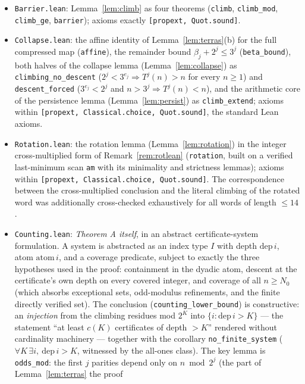 \documentclass[11pt]{article}
\theoremstyle{definition}
\begin{document}
\begin{itemize}
\item \texttt{Barrier.lean}: Lemma~\ref{lem:climb} as four theorems
  (\texttt{climb}, \texttt{climb\_mod}, \texttt{climb\_ge},
  \texttt{barrier}); axioms exactly \texttt{[propext, Quot.sound]}.
\item \texttt{Collapse.lean}: the affine identity of
  Lemma~\ref{lem:terras}(b) for the full compressed map
  (\texttt{affine}), the remainder bound $\beta_j+2^j\le 3^j$
  (\texttt{beta\_bound}), both halves of the collapse lemma
  (Lemma~\ref{lem:collapse}) as \texttt{climbing\_no\_descent} ($2^j<
  3^{e_j}\Rightarrow T^j(n)>n$ for every $n\ge 1$) and
  \texttt{descent\_forced} ($3^{e_j}<2^j$ and $n>3^j\Rightarrow
  T^j(n)<n$), and the arithmetic core of the persistence lemma
  (Lemma~\ref{lem:persist}) as \texttt{climb\_extend}; axioms within
  \texttt{[propext, Classical.choice, Quot.sound]}, the standard Lean
  axioms.
\item \texttt{Rotation.lean}: the rotation lemma
  (Lemma~\ref{lem:rotation}) in the integer cross-multiplied form of
  Remark~\ref{rem:rotlean} (\texttt{rotation}, built on a verified
  last-minimum scan \texttt{am} with its minimality and strictness
  lemmas); axioms within \texttt{[propext, Classical.choice,
  Quot.sound]}. The correspondence between the cross-multiplied
  conclusion and the literal climbing of the rotated word was
  additionally cross-checked exhaustively for all words of length
  $\le 14$.
\item \texttt{Counting.lean}: \emph{Theorem A itself}, in an abstract
  certificate-system formulation. A system is abstracted as an index
  type $I$ with depth $\mathrm{dep}\,i$, atom $\mathrm{atom}\,i$, and a
  coverage predicate, subject to exactly the three hypotheses used in
  the proof: containment in the dyadic atom, descent at the
  certificate's own depth on every covered integer, and coverage of all
  $n\ge N_0$ (which absorbs exceptional sets, odd-modulus refinements,
  and the finite directly verified set). The conclusion
  (\texttt{counting\_lower\_bound}) is constructive: an
  \emph{injection} from the climbing residues mod $2^K$ into
  $\{i: \mathrm{dep}\,i>K\}$ --- the statement ``at least $c(K)$
  certificates of depth $>K$'' rendered without cardinality machinery
  --- together with the corollary \texttt{no\_finite\_system} ($\forall
  K\,\exists i,\ \mathrm{dep}\,i>K$, witnessed by the all-ones class).
  The key lemma is \texttt{odds\_mod}: the first $j$ parities depend
  only on $n \bmod 2^j$ (the part of Lemma~\ref{lem:terras} the proof

\end{itemize}
\end{document}
